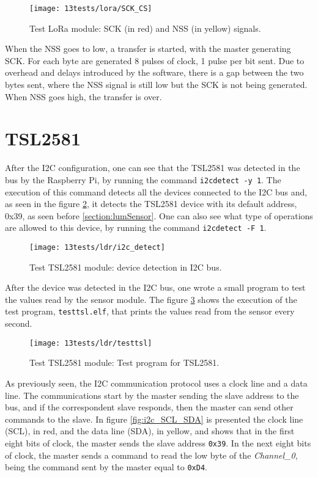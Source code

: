 \begin{figure}[H]
	\centering	
	\texttt{[image: 13tests/lora/SCK\_CS]}
	\caption{Test LoRa module: SCK (in red) and NSS (in yellow) signals.}
	\label{fig:loratest_sck_nss}
\end{figure}

When the NSS goes to low, a transfer is started, with the master generating SCK. For each byte are generated 8 pulses of clock, 1 pulse per bit sent. Due to overhead and delays introduced by the software, there is a gap between the two bytes sent, where the NSS signal is still low but the SCK is not being generated. When NSS goes high, the transfer is over.

\section{TSL2581}
After the I2C configuration, one can see that the TSL2581 was detected in the bus by the Raspberry Pi, by running the command \verb|i2cdetect -y 1|. The execution of this command detects all the devices connected to the I2C bus and, as seen in the figure \ref{fig:i2cDetect}, it detects the TSL2581 device with its default address, 0x39, as seen before \ref{section:lumSensor}. One can also see what type of operations are allowed to this device, by running the command \verb|i2cdetect -F 1|.

\begin{figure}[H]
	\centering	
	\texttt{[image: 13tests/ldr/i2c\_detect]}
	\caption{Test TSL2581 module: device detection in I2C bus.}
	\label{fig:i2cDetect}
\end{figure}

After the device was detected in the I2C bus, one wrote a small program to test the values read by the sensor module. The figure \ref{fig:testtsl} shows the execution of the test program, \verb|testtsl.elf|, that prints the values read from the sensor every second.

\begin{figure}[H]
	\centering	
	\texttt{[image: 13tests/ldr/testtsl]}
	\caption{Test TSL2581 module: Test program for TSL2581.}
	\label{fig:testtsl}
\end{figure}

As previously seen, the I2C communication protocol uses a clock line and a data line. The communications start by the master sending the slave address to the bus, and if the correspondent slave responds, then the master can send other commands to the slave. In figure \ref{fig:i2c_SCL_SDA} is presented the clock line (SCL), in red, and the data line (SDA), in yellow, and shows that in the first eight bits of clock, the master sends the slave address \verb|0x39|. In the next eight bits of clock, the master sends a command to read the low byte of the \textit{Channel\_0}, being the command sent by the master equal to \verb|0xD4|.

